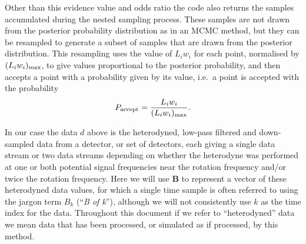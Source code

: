 Other than this evidence value and odds ratio the code also returns the samples accumulated during
the nested sampling process. These samples are not drawn from the posterior probability distribution as in
an MCMC method, but they can be resampled to generate a subset of samples that are drawn from the posterior
distribution. This resampling \citep[performed using the {\tt lalapps\_nest2pos} {\tt python} script within
{\tt lalapps}][]{lalsuite} uses the
value of $L_i w_i$ for each point, normalised by $(L_iw_i)_{\rm max}$, to give values proportional to the
posterior probability, and then accepts a point with a probability given by its value, i.e.\ a point is
accepted with the probability
\begin{equation}\label{eq:postaccept}
P_{\text{accept}} = \frac{L_i w_i}{(L_iw_i)_{\rm max}}.
\end{equation}

In our case the data $d$ above is the heterodyned, low-pass filtered and down-sampled data
from a detector, or set of detectors, each giving a single data stream or two data streams depending on
whether the heterodyne was performed at one or both potential signal frequencies near the rotation frequency
and/or twice the rotation frequency. Here we will use $\mathbf{B}$ to represent a vector of these heterodyned
data values, for which a single time sample is often referred to using the jargon term $B_k$ (``{\it B of k}''), although we will
not consistently use $k$ as the time index for the data. Throughout this document if we refer to ``heterodyned'' data we mean
data that has been processed, or simulated as if processed, by this method.
